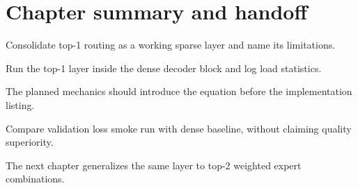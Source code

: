 \section{Chapter summary and handoff}
\label{sec:ch04-chapter-summary-and-handoff}

Consolidate top-1 routing as a working sparse layer and name its limitations.



Run the top-1 layer inside the dense decoder block and log load statistics.



The planned mechanics should introduce the equation before the implementation listing.





\begin{checkpointbox}
Compare validation loss smoke run with dense baseline, without claiming quality superiority.
\end{checkpointbox}

The next chapter generalizes the same layer to top-2 weighted expert combinations.
